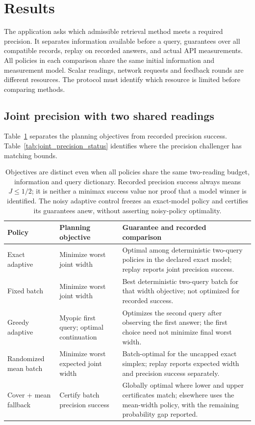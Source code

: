 \documentclass[12pt]{article}
\begin{document}
\section{Results}\label{sec:evaluation}
The application asks which admissible retrieval method meets a required
precision. It separates information available before a query, guarantees
over all compatible records, replay on recorded answers, and actual API
measurements. All policies in each comparison share the same initial
information and measurement model. Scalar readings, network requests and
feedback rounds are different resources. The protocol must identify which
resource is limited before comparing methods.

\subsection{Joint precision with two shared readings}\label{sec:joint-results}
Table~\ref{tab:joint_objectives} separates the planning objectives from
recorded precision success. Table~\ref{tab:joint_precision_status}
identifies where the precision challenger has matching bounds.
\begin{table}[htbp]
\centering\small
\begin{tabular}{>{\raggedright\arraybackslash}p{.19\linewidth}>{\raggedright\arraybackslash}p{.25\linewidth}>{\raggedright\arraybackslash}p{.45\linewidth}}
\toprule
Policy & Planning objective & Guarantee and recorded comparison\\
\midrule
Exact adaptive & Minimize worst joint width & Optimal among deterministic two-query policies in the declared exact model; replay reports joint precision success.\\
Fixed batch & Minimize worst joint width & Best deterministic two-query batch for that width objective; not optimized for recorded success.\\
Greedy adaptive & Myopic first query; optimal continuation & Optimizes the second query after observing the first answer; the first choice need not minimize final worst width.\\
Randomized mean batch & Minimize worst expected joint width & Batch-optimal for the uncapped exact simplex; replay reports expected width and precision success separately.\\
Cover + mean fallback & Certify batch precision success & Globally optimal where lower and upper certificates match; elsewhere uses the mean-width policy, with the remaining probability gap reported.\\
\bottomrule
\end{tabular}
\caption{Objectives are distinct even when all policies share the same two-reading budget, information and query dictionary. Recorded precision success always means $J\leq1/2$; it is neither a minimax success value nor proof that a model winner is identified. The noisy adaptive control freezes an exact-model policy and certifies its guarantees anew, without asserting noisy-policy optimality.}
\label{tab:joint_objectives}
\end{table}
\end{document}
